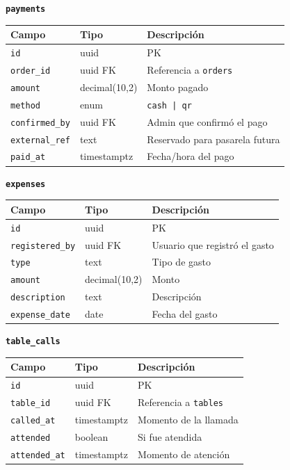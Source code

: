 \vspace{6pt}
\noindent\textbf{\texttt{payments}}

\begin{tabular}{lll}
  \toprule
  \textbf{Campo} & \textbf{Tipo} & \textbf{Descripción} \\
  \midrule
  \texttt{id}           & uuid          & PK \\
  \texttt{order\_id}    & uuid FK       & Referencia a \texttt{orders} \\
  \texttt{amount}       & decimal(10,2) & Monto pagado \\
  \texttt{method}       & enum          & \texttt{cash | qr} \\
  \texttt{confirmed\_by} & uuid FK      & Admin que confirmó el pago \\
  \texttt{external\_ref} & text         & Reservado para pasarela futura \\
  \texttt{paid\_at}     & timestamptz   & Fecha/hora del pago \\
  \bottomrule
\end{tabular}

\vspace{6pt}
\noindent\textbf{\texttt{expenses}}

\begin{tabular}{lll}
  \toprule
  \textbf{Campo} & \textbf{Tipo} & \textbf{Descripción} \\
  \midrule
  \texttt{id}             & uuid          & PK \\
  \texttt{registered\_by} & uuid FK       & Usuario que registró el gasto \\
  \texttt{type}           & text          & Tipo de gasto \\
  \texttt{amount}         & decimal(10,2) & Monto \\
  \texttt{description}    & text          & Descripción \\
  \texttt{expense\_date}  & date          & Fecha del gasto \\
  \bottomrule
\end{tabular}

\clearpage
\noindent\textbf{\texttt{table\_calls}}

\begin{tabular}{lll}
  \toprule
  \textbf{Campo} & \textbf{Tipo} & \textbf{Descripción} \\
  \midrule
  \texttt{id}          & uuid        & PK \\
  \texttt{table\_id}   & uuid FK     & Referencia a \texttt{tables} \\
  \texttt{called\_at}  & timestamptz & Momento de la llamada \\
  \texttt{attended}    & boolean     & Si fue atendida \\
  \texttt{attended\_at} & timestamptz & Momento de atención \\
  \bottomrule
\end{tabular}

